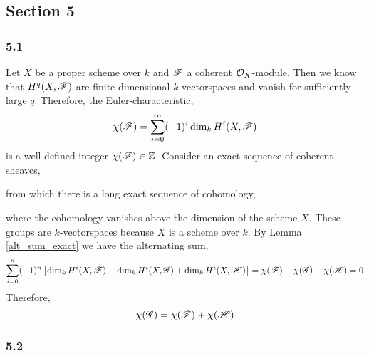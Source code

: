 \documentclass[12pt]{article}
\begin{document}
\subsection{Section 5}

\subsubsection{5.1}

Let $X$ be a proper scheme over $k$ and $\mathscr{F}$ a coherent $\mathcal{O}_{X}$-module. Then we know that $H^q(X, \mathscr{F})$ are finite-dimensional $k$-vectorspaces and vanish for sufficiently large $q$. Therefore, the Euler-characteristic,
\[ \chi(\mathscr{F}) = \sum_{i = 0}^\infty (-1)^i \dim_k H^i(X, \mathscr{F}) \]
is a well-defined integer $\chi(\mathscr{F}) \in \mathbb{Z}$. 
Consider an exact sequence of coherent sheaves,  
\begin{center}
\end{center}
from which there is a long exact sequence of cohomology,
\begin{center}
\end{center}
where the cohomology vanishes above the dimension of the scheme $X$. These groups are $k$-vectorspaces because $X$ is a scheme over $k$. By Lemma \ref{alt_sum_exact} we have the alternating sum,
\begin{align*}
\sum_{i = 0}^n (-1)^n \left[ \dim_k H^i(X, \mathscr{F}) - \dim_k H^i(X, \mathscr{G}) + \dim_k H^i(X, \mathscr{H}) \right] = \chi(\mathscr{F}) - \chi(\mathscr{G}) + \chi(\mathscr{H}) = 0  
\end{align*}
Therefore,
\[ \chi(\mathscr{G}) = \chi(\mathscr{F}) + \chi(\mathscr{H}) \]


\subsubsection{5.2}
\end{document}
